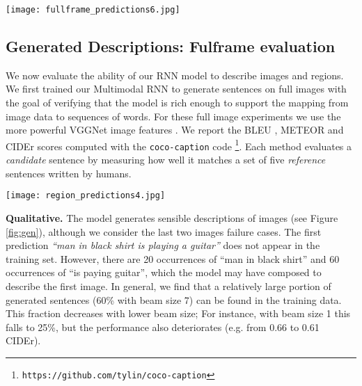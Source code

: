\documentclass[10pt,twocolumn,letterpaper]{article}
\begin{document}
\begin{figure*}[t]
\texttt{[image: fullframe\_predictions6.jpg]}
\caption{Example sentences generated by the multimodal RNN for test images. We provide many more examples on our project page.}
\label{fig:gen}
\vspace{-0.1in}
\end{figure*}

\subsection{Generated Descriptions: Fulframe evaluation}
\vspace{-0.15in}

We now evaluate the ability of our RNN model to describe images and regions. We first trained our Multimodal RNN to generate sentences on full images with the goal of verifying that the model is rich enough to support the mapping from image data to sequences of words. For these full image experiments we use the more powerful VGGNet image features \cite{simonyan2014very}.  We report the BLEU \cite{papineni2002bleu}, METEOR \cite{meteor} and CIDEr \cite{cider} scores computed with the \texttt{coco-caption} code \cite{capeval2015} \footnote{\texttt{https://github.com/tylin/coco-caption}}. Each method evaluates a \textit{candidate} sentence by measuring how well it matches a set of five \textit{reference} sentences written by humans. 

\begin{figure*}[t]
\texttt{[image: region\_predictions4.jpg]}
\caption{Example region predictions. We use our region-level multimodal RNN to generate text (shown on the right of each image) for some of the bounding boxes in each image. The lines are grounded to centers of bounding boxes and the colors are chosen arbitrarily.}
\label{fig:genregion}
\vspace{-0.15in}
\end{figure*}

\textbf{Qualitative.} The model generates sensible descriptions of images (see Figure \ref{fig:gen}), although we consider the last two images failure cases. The first prediction \textit{``man in black shirt is playing a guitar''} does not appear in the training set. However, there are 20 occurrences of ``man in black shirt'' and 60 occurrences of ``is paying guitar'', which the model may have composed to describe the first image. In general, we find that a relatively large portion of generated sentences (60\% with beam size 7) can be found in the training data. This fraction decreases with lower beam size; For instance, with beam size 1 this falls to 25\%, but the performance also deteriorates (e.g. from 0.66 to 0.61 CIDEr).
\end{document}
